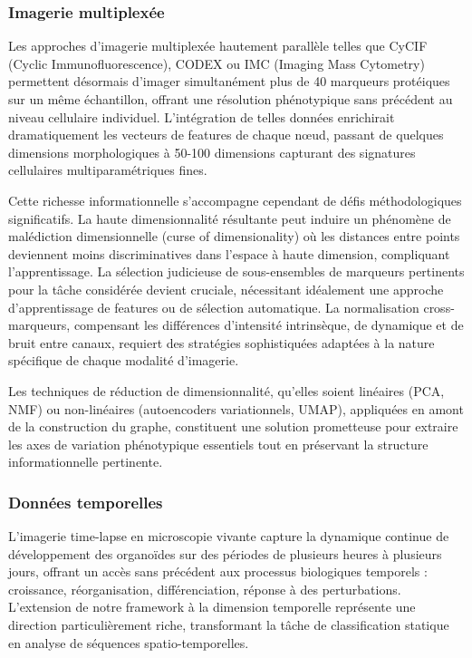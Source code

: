\subsubsection{Imagerie multiplexée}

Les approches d'imagerie multiplexée hautement parallèle telles que CyCIF (Cyclic Immunofluorescence), CODEX ou IMC (Imaging Mass Cytometry) permettent désormais d'imager simultanément plus de 40 marqueurs protéiques sur un même échantillon, offrant une résolution phénotypique sans précédent au niveau cellulaire individuel. L'intégration de telles données enrichirait dramatiquement les vecteurs de features de chaque nœud, passant de quelques dimensions morphologiques à 50-100 dimensions capturant des signatures cellulaires multiparamétriques fines.

Cette richesse informationnelle s'accompagne cependant de défis méthodologiques significatifs. La haute dimensionnalité résultante peut induire un phénomène de malédiction dimensionnelle (curse of dimensionality) où les distances entre points deviennent moins discriminatives dans l'espace à haute dimension, compliquant l'apprentissage. La sélection judicieuse de sous-ensembles de marqueurs pertinents pour la tâche considérée devient cruciale, nécessitant idéalement une approche d'apprentissage de features ou de sélection automatique. La normalisation cross-marqueurs, compensant les différences d'intensité intrinsèque, de dynamique et de bruit entre canaux, requiert des stratégies sophistiquées adaptées à la nature spécifique de chaque modalité d'imagerie.

Les techniques de réduction de dimensionnalité, qu'elles soient linéaires (PCA, NMF) ou non-linéaires (autoencoders variationnels, UMAP), appliquées en amont de la construction du graphe, constituent une solution prometteuse pour extraire les axes de variation phénotypique essentiels tout en préservant la structure informationnelle pertinente.

\subsubsection{Données temporelles}

L'imagerie time-lapse en microscopie vivante capture la dynamique continue de développement des organoïdes sur des périodes de plusieurs heures à plusieurs jours, offrant un accès sans précédent aux processus biologiques temporels : croissance, réorganisation, différenciation, réponse à des perturbations. L'extension de notre framework à la dimension temporelle représente une direction particulièrement riche, transformant la tâche de classification statique en analyse de séquences spatio-temporelles.

